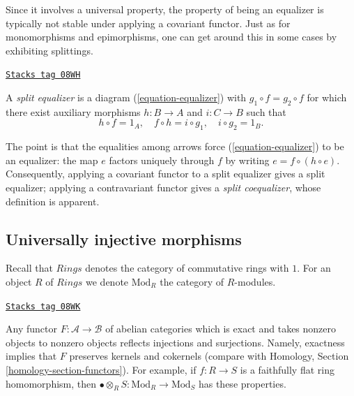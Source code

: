 \medskip\noindent
Since it involves a universal property, the property of being an equalizer is
typically not stable under applying a covariant functor. Just as for
monomorphisms and epimorphisms, one can get around this in some
cases by exhibiting splittings.

\begin{definition}
\label{descent-definition-split-equalizer}
\href{https://stacks.math.columbia.edu/tag/08WH}{\texttt{Stacks tag 08WH}}

A {\it split equalizer} is a diagram (\ref{equation-equalizer}) with
$g_1 \circ f = g_2 \circ f$ for which there exist auxiliary morphisms
$h : B \to A$ and $i : C \to B$ such that
\begin{equation}
\label{equation-split-equalizer-conditions}
h \circ f = 1_A, \quad f \circ h = i \circ g_1, \quad i \circ g_2 = 1_B.
\end{equation}
\end{definition}

The point is that the equalities among arrows force (\ref{equation-equalizer})
to be an equalizer: the map $e$ factors uniquely through $f$ by writing
$e = f \circ (h \circ e)$. Consequently, applying a covariant functor
to a split equalizer gives a split equalizer; applying a contravariant functor
gives a {\it split coequalizer}, whose definition is apparent.

\subsection{Universally injective morphisms}
\label{descent-subsection-universally-injective}

Recall that $\textit{Rings}$ denotes the category of commutative rings
with $1$. For an object $R$ of $\textit{Rings}$ we denote $\text{Mod}_R$
the category of $R$-modules.

\begin{remark}[Reflects]
\label{descent-remark-reflects}
\href{https://stacks.math.columbia.edu/tag/08WK}{\texttt{Stacks tag 08WK}}

Any functor $F : \mathcal{A} \to \mathcal{B}$ of abelian categories
which is exact and takes nonzero objects to nonzero objects reflects
injections and surjections. Namely, exactness implies that
$F$ preserves kernels and cokernels (compare with
Homology, Section \ref{homology-section-functors}).
For example, if $f : R \to S$ is a
faithfully flat ring homomorphism, then
$\bullet \otimes_R S: \text{Mod}_R \to \text{Mod}_S$ has these properties.
\end{remark}

